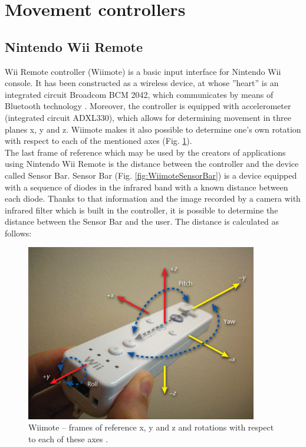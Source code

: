 \documentclass{jacsart}
\begin{document}
\section{Movement controllers} \label{sec:controllers}
\subsection{Nintendo Wii Remote} \label{ssec:wiimote}

\indent Wii Remote controller (Wiimote) is a basic input interface for Nintendo Wii console. It has been constructed as a wireless device, at whose ''heart'' is an integrated circuit Broadcom BCM 2042, which communicates by means of Bluetooth technology \cite{wiibrew}. Moreover, the controller is equipped with accelerometer (integrated circuit ADXL330), which allows for determining movement in three planes x, y and z. Wiimote makes it also possible to determine one’s own rotation  with respect to each of the mentioned axes (Fig. \ref{fig:wiimote}).\\
\indent The last frame of reference which may be used by the creators of applications using Nintendo Wii Remote is the distance between the controller and the device called Sensor Bar. Sensor Bar (Fig. \ref{fig:WiimoteSensorBar}) is a device equipped with a sequence of diodes in the infrared band with a known distance between each diode. Thanks to that information and the image recorded by a camera with infrared filter which is built in the controller, it is possible to determine the distance between the Sensor Bar and the user. The distance is calculated as follows:

\begin{figure}[!t]
\centering
\includegraphics[width=0.9\textwidth]{WiiMoteCoordinates.jpg}
\caption{Wiimote – frames of reference x, y and z and rotations with respect to each of these axes \cite{Jr2011}.}
\label{fig:wiimote}
\end{figure}
\end{document}
